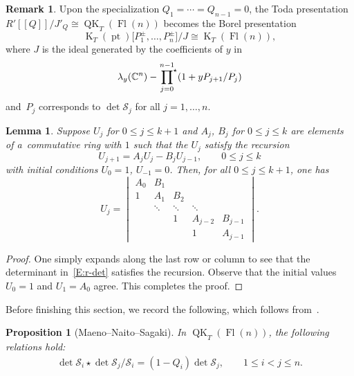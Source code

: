 \documentclass[11pt]{article}
\numberwithin{equation}{section}
\numberwithin{equation}{section}
\newtheorem{Lemma}[Theorem]{Lemma}
\newtheorem{Proposition}[Theorem]{Proposition}
\theoremstyle{definition}
\newtheorem{Remark}[Theorem]{Remark}
\DeclareMathOperator{\Fl}{Fl}
\DeclareMathOperator{\QK}{QK}
\DeclareMathOperator{\K}{K}
\DeclareMathOperator{\pt}{pt}
\newcommand{\C}{{\mathbb C}}
\newcommand{\cS}{{\mathcal S}}
\begin{document}
 \begin{Remark}
 Upon the specialization $Q_1=\dotsm=Q_{n-1}=0$, the Toda presentation $R'[\![Q]\!]/J'_Q\cong\QK_T(\Fl(n))$ becomes the Borel presentation
 \[
 \K_T(\pt)\bigl[P_1^\pm,\dots,P_n^{\pm}\bigr]/J\cong \K_T(\Fl(n)),
 \]
 where $J$ is the ideal generated by the coefficients of $y$ in
 \[
 \lambda_y(\C^n)-\sideset{}{^\star}\prod_{j=0}^{n-1} (1+yP_{j+1}/P_j)
 \]
 and~$P_j$ corresponds to $\det \cS_j$ for all $j=1,\dots,n$.
 \end{Remark}
 \begin{Lemma}
 \label{L:r-det}
 Suppose $U_j$ for $0\le j\le k+1$ and $A_j$, $B_j$ for $0\le j\le k$ are elements of a~commutative ring with $1$ such that the $U_j$ satisfy the recursion
 \begin{equation*}
 U_{j+1}=A_jU_{j}-B_jU_{j-1},\qquad 0\le j\le k
 \end{equation*}
 with initial conditions $U_0=1$, $U_{-1}=0$. Then, for all $0\le j\le k+1$, one has
 \begin{equation}
 \label{E:r-det}
 U_j=
 \begin{vmatrix}
 A_0 & B_1 & & & \\
 1 & A_1 & B_2 & & \\
 & \ddots & \ddots & \ddots & \\
 & & 1 & A_{j-2} & B_{j-1}\\
 & & & 1 & A_{j-1}
 \end{vmatrix}.
 \end{equation}
 \end{Lemma}

 \begin{proof}
 One simply expands along the last row or column to see that the determinant in~\eqref{E:r-det} satisfies the recursion. Observe that the initial values $U_0=1$ and $U_1=A_0$ agree. This completes the proof.
 \end{proof}

 Before finishing this section, we record the following, which follows from~\cite[Proposition~5.2]{maeno.naito.sagaki:QKideal}.

 \begin{Proposition}[Maeno--Naito--Sagaki]\label{prop:MNS}
 In $\QK_T(\Fl(n))$, the following relations hold:
 \begin{gather*}
 \det \cS_i \star \det \cS_j/\cS_i = (1-Q_i) \det \cS_j, \qquad 1 \le i < j \le n.
 \end{gather*}
 \end{Proposition}
\end{document}
